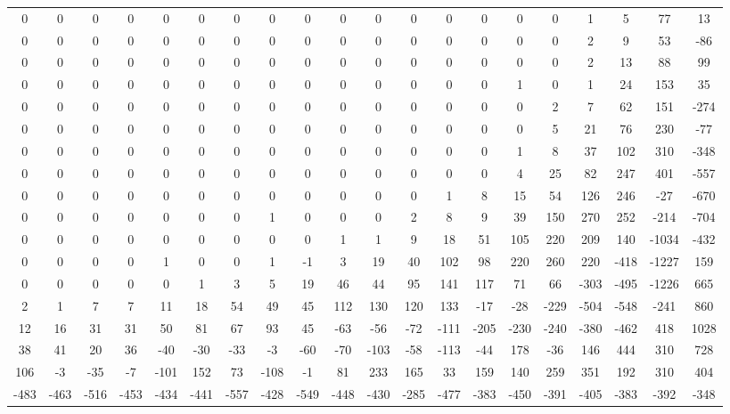 \begin{tabular}{ | * {20}{c} | } 
0 & 0 & 0 & 0 & 0 & 0 & 0 & 0 & 0 & 0 & 0 & 0 & 0 & 0 & 0 & 0 & 1 & 5 & 77 & 13 \\ 
0 & 0 & 0 & 0 & 0 & 0 & 0 & 0 & 0 & 0 & 0 & 0 & 0 & 0 & 0 & 0 & 2 & 9 & 53 & -86 \\ 
0 & 0 & 0 & 0 & 0 & 0 & 0 & 0 & 0 & 0 & 0 & 0 & 0 & 0 & 0 & 0 & 2 & 13 & 88 & 99 \\ 
0 & 0 & 0 & 0 & 0 & 0 & 0 & 0 & 0 & 0 & 0 & 0 & 0 & 0 & 1 & 0 & 1 & 24 & 153 & 35 \\ 
0 & 0 & 0 & 0 & 0 & 0 & 0 & 0 & 0 & 0 & 0 & 0 & 0 & 0 & 0 & 2 & 7 & 62 & 151 & -274 \\ 
0 & 0 & 0 & 0 & 0 & 0 & 0 & 0 & 0 & 0 & 0 & 0 & 0 & 0 & 0 & 5 & 21 & 76 & 230 & -77 \\ 
0 & 0 & 0 & 0 & 0 & 0 & 0 & 0 & 0 & 0 & 0 & 0 & 0 & 0 & 1 & 8 & 37 & 102 & 310 & -348 \\ 
0 & 0 & 0 & 0 & 0 & 0 & 0 & 0 & 0 & 0 & 0 & 0 & 0 & 0 & 4 & 25 & 82 & 247 & 401 & -557 \\ 
0 & 0 & 0 & 0 & 0 & 0 & 0 & 0 & 0 & 0 & 0 & 0 & 1 & 8 & 15 & 54 & 126 & 246 & -27 & -670 \\ 
0 & 0 & 0 & 0 & 0 & 0 & 0 & 1 & 0 & 0 & 0 & 2 & 8 & 9 & 39 & 150 & 270 & 252 & -214 & -704 \\ 
0 & 0 & 0 & 0 & 0 & 0 & 0 & 0 & 0 & 1 & 1 & 9 & 18 & 51 & 105 & 220 & 209 & 140 & -1034 & -432 \\ 
0 & 0 & 0 & 0 & 1 & 0 & 0 & 1 & -1 & 3 & 19 & 40 & 102 & 98 & 220 & 260 & 220 & -418 & -1227 & 159 \\ 
0 & 0 & 0 & 0 & 0 & 1 & 3 & 5 & 19 & 46 & 44 & 95 & 141 & 117 & 71 & 66 & -303 & -495 & -1226 & 665 \\ 
2 & 1 & 7 & 7 & 11 & 18 & 54 & 49 & 45 & 112 & 130 & 120 & 133 & -17 & -28 & -229 & -504 & -548 & -241 & 860 \\ 
12 & 16 & 31 & 31 & 50 & 81 & 67 & 93 & 45 & -63 & -56 & -72 & -111 & -205 & -230 & -240 & -380 & -462 & 418 & 1028 \\ 
38 & 41 & 20 & 36 & -40 & -30 & -33 & -3 & -60 & -70 & -103 & -58 & -113 & -44 & 178 & -36 & 146 & 444 & 310 & 728 \\ 
106 & -3 & -35 & -7 & -101 & 152 & 73 & -108 & -1 & 81 & 233 & 165 & 33 & 159 & 140 & 259 & 351 & 192 & 310 & 404 \\ 
-483 & -463 & -516 & -453 & -434 & -441 & -557 & -428 & -549 & -448 & -430 & -285 & -477 & -383 & -450 & -391 & -405 & -383 & -392 & -348 \\ 
 \end{tabular} 
